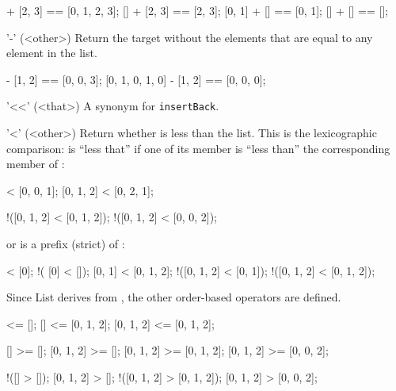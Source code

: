 \begin{urbiscriptapi}
\begin{urbiassert}
[0, 1] + [2, 3] == [0, 1, 2, 3];
[] + [2, 3] == [2, 3];
[0, 1] + [] == [0, 1];
[] + [] == [];
\end{urbiassert}

\item['-'](<other>)%
  Return the target without the elements that are equal to any element
  in the  list.

\begin{urbiassert}
[0, 1, 0, 2, 3] - [1, 2] == [0, 0, 3];
[0, 1, 0, 1, 0] - [1, 2] == [0, 0, 0];
\end{urbiassert}

\item['<<'](<that>)%
  A synonym for \lstinline|insertBack|.

\item['<'](<other>)%
  Return whether \this is less than the  list.  This is the
  lexicographic comparison: \this is ``less that'' if one of its member is
  ``less than'' the corresponding member of :

\begin{urbiassert}
  [0, 0, 0] < [0, 0, 1];
  [0, 1, 2] < [0, 2, 1];

!([0, 1, 2] < [0, 1, 2]);
!([0, 1, 2] < [0, 0, 2]);
\end{urbiassert}

  \noindent
  or  is a prefix (strict) of \this:

\begin{urbiassert}
           [] < [0];          !(      [0] < []);
       [0, 1] < [0, 1, 2];    !([0, 1, 2] < [0, 1]);
  !([0, 1, 2] < [0, 1, 2]);
\end{urbiassert}

  Since List derives from , the other order-based
  operators are defined.

\begin{urbiassert}
        [] <= [];
        [] <= [0, 1, 2];
 [0, 1, 2] <= [0, 1, 2];

        [] >= [];
 [0, 1, 2] >= [];
 [0, 1, 2] >= [0, 1, 2];
 [0, 1, 2] >= [0, 0, 2];

       !([] > []);
  [0, 1, 2] > [];
!([0, 1, 2] > [0, 1, 2]);
  [0, 1, 2] > [0, 0, 2];
\end{urbiassert}
\end{urbiscriptapi}

